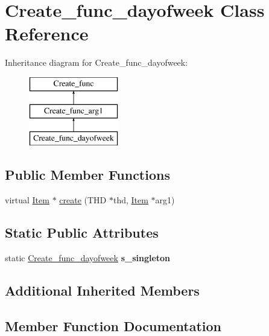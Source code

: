 \hypertarget{classCreate__func__dayofweek}{}\section{Create\+\_\+func\+\_\+dayofweek Class Reference}
\label{classCreate__func__dayofweek}
Inheritance diagram for Create\+\_\+func\+\_\+dayofweek\+:\begin{figure}[H]
\begin{center}
\leavevmode
\includegraphics[height=3.000000cm]{classCreate__func__dayofweek}
\end{center}
\end{figure}
\subsection*{Public Member Functions}
\begin{DoxyCompactItemize}
\item 
virtual \mbox{\hyperlink{classItem}{Item}} $\ast$ \mbox{\hyperlink{classCreate__func__dayofweek_afb15d51ee9f8beb1863dcf60fac2963b}{create}} (T\+HD $\ast$thd, \mbox{\hyperlink{classItem}{Item}} $\ast$arg1)
\end{DoxyCompactItemize}
\subsection*{Static Public Attributes}
\begin{DoxyCompactItemize}
\item 
\mbox{\label{classCreate__func__dayofweek_ac7cc34e1b96e0db048667694190fd503}} 
static \mbox{\hyperlink{classCreate__func__dayofweek}{Create\+\_\+func\+\_\+dayofweek}} {\bfseries s\+\_\+singleton}
\end{DoxyCompactItemize}
\subsection*{Additional Inherited Members}


\subsection{Member Function Documentation}
\mbox{\label{classCreate__func__dayofweek_afb15d51ee9f8beb1863dcf60fac2963b}} 
